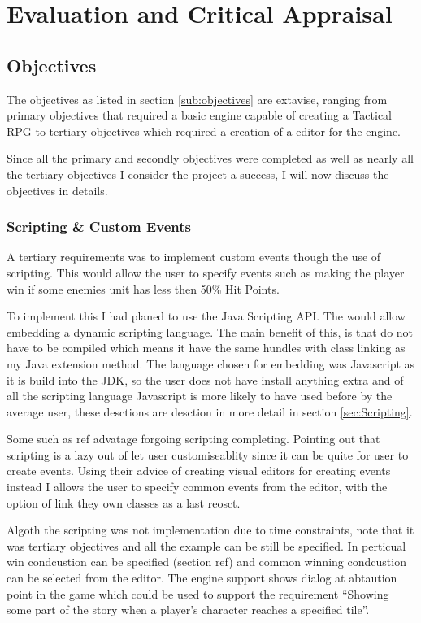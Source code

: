 \section{Evaluation and Critical Appraisal}

\subsection{Objectives}
\label{sub:eobjectives}
The objectives as listed in section \ref{sub:objectives}  are extavise, ranging from primary objectives that required a basic engine capable of creating a Tactical RPG to tertiary objectives which required a creation of a editor for the engine. 

Since all the primary and secondly objectives were completed as well as nearly all the tertiary objectives I consider  the project a success, I will now discuss the objectives in details.

\subsubsection{Scripting \& Custom Events}
A tertiary requirements was to implement custom events though the use of scripting.  This would allow the user to specify events such as making the player win if some enemies unit has less then 50\% Hit Points. 

To implement this I had planed to use the Java Scripting API\cite{javas}. The would allow embedding a dynamic scripting language.  The main benefit of this, is that do not have to be compiled which means it have the same hundles with class linking as my Java extension method.   The language chosen for embedding was Javascript  as it is build into the JDK, so the user does not have install anything extra and of all the scripting language Javascript  is more likely to have used before by the average user, these desctions are desction in more detail in section \ref{sec:Scripting}. 

Some such as ref  advatage forgoing scripting completing. Pointing out that scripting is a lazy out of let user customiseablity since it can be quite for user to create events.  Using their advice of creating visual editors for creating events instead I allows the user to specify common events from the editor, with the option of link they own classes as a last reosct. 

Algoth the scripting was not implementation due to time constraints, note that it was  tertiary objectives and all the example can be still be specified. In perticual win condcustion can be specified (section ref) and common winning condcustion can be selected from the editor.  The engine support shows dialog at abtaution point in the game which could be used to support the requirement ``Showing some part of the story when a player’s character reaches a specified tile''.


